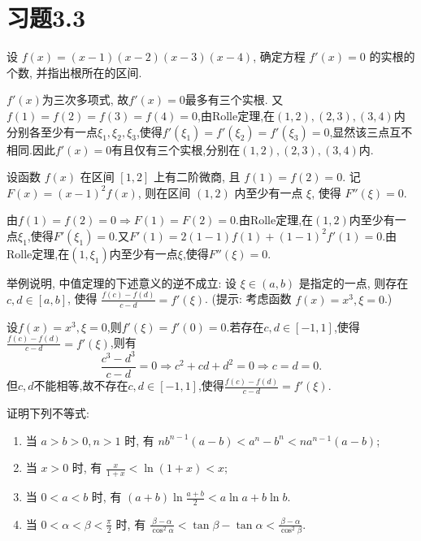 \section{习题3.3}
\begin{exercise}[3.3.1]
    设 $f(x)=(x-1)(x-2)(x-3)(x-4)$, 确定方程 $f'(x)=0$ 的实根的个数, 并指出根所在的区间.
\end{exercise}

\begin{solution}
    $f'(x)$为三次多项式, 故$f'(x)=0$最多有三个实根. 又$f(1) = f(2) = f(3) = f(4) = 0$,由Rolle定理,在$(1,2),(2,3),(3,4)$内分别各至少有一点$\xi_1,\xi_2,\xi_3$,使得$f'(\xi_1) = f'(\xi_2) = f'(\xi_3) = 0$,显然该三点互不相同.因此$f'(x)=0$有且仅有三个实根,分别在$(1,2),(2,3),(3,4)$内.
\end{solution}

\begin{exercise}[3.3.2]
    设函数 $f(x)$ 在区间 $[1,2]$ 上有二阶微商, 且 $f(1)=f(2)=0$. 记 $F(x)=(x-1)^2 f(x)$, 则在区间 $(1,2)$ 内至少有一点 $\xi$, 使得 $F''(\xi)=0$.
\end{exercise}

\begin{solution}
    由$f(1) = f(2) = 0 \Rightarrow F(1) = F(2) = 0$.由Rolle定理,在$(1,2)$内至少有一点$\xi_1$,使得$F'(\xi_1) = 0$.又$F'(1) = 2(1-1)f(1) + (1-1)^2 f'(1) = 0$.由Rolle定理,在$(1,\xi_1)$内至少有一点$\xi$,使得$F''(\xi) = 0$.
\end{solution}

\begin{exercise}[3.3.3]
    举例说明, 中值定理的下述意义的逆不成立: 设 $\xi \in (a,b)$ 是指定的一点, 则存在 $c,d \in [a,b]$, 使得 $\frac{f(c)-f(d)}{c-d}=f'(\xi)$. (提示: 考虑函数 $f(x)=x^3, \xi=0$.)
\end{exercise}

\begin{solution}
    设$f(x) = x^3, \xi = 0$,则$f'(\xi) = f'(0) = 0$.若存在$c,d \in [-1,1]$,使得$\frac{f(c)-f(d)}{c-d} = f'(\xi)$,则有
    $$
        \frac{c^3 - d^3}{c-d} = 0 \Rightarrow c^2 + cd + d^2 = 0 \Rightarrow c = d = 0.
    $$
    但$c,d$不能相等,故不存在$c,d \in [-1,1]$,使得$\frac{f(c)-f(d)}{c-d} = f'(\xi)$.
\end{solution}

\begin{exercise}[3.3.4]
    证明下列不等式:
    \begin{enumerate}
        \item 当 $a>b>0, n>1$ 时, 有 $nb^{n-1}(a-b) < a^n-b^n < na^{n-1}(a-b)$;
        \item 当 $x>0$ 时, 有 $\frac{x}{1+x} < \ln(1+x) < x$;
        \item 当 $0<a<b$ 时, 有 $(a+b)\ln\frac{a+b}{2} < a\ln a + b\ln b$.
        \item 当 $0<\alpha<\beta<\frac{\pi}{2}$ 时, 有 $\frac{\beta-\alpha}{\cos^2\alpha} < \tan\beta - \tan\alpha < \frac{\beta-\alpha}{\cos^2\beta}$.
    \end{enumerate}
\end{exercise}

